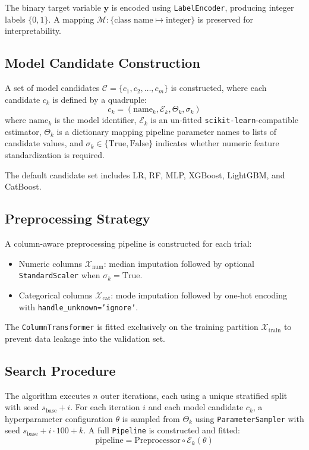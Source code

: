 \documentclass[diagnostics,article,submit,pdftex,moreauthors]{Definitions/mdpi}
\begin{document}
The binary target variable $\mathbf{y}$ is encoded using
\texttt{LabelEncoder}, producing integer labels $\{0, 1\}$. A mapping
$\mathcal{M}: \{\text{class name} \mapsto \text{integer}\}$ is
preserved for interpretability.

\subsection[\appendixname~\thesubsection]{Model Candidate
  Construction}
A set of model candidates $\mathcal{C} = \{c_1, c_2, \ldots, c_m\}$ is
constructed, where each candidate $c_k$ is defined by a quadruple:
\[
c_k = (\text{name}_k, \mathcal{E}_k, \Theta_k, \sigma_k)
\]
where $\text{name}_k$ is the model identifier, $\mathcal{E}_k$ is an
un-fitted \texttt{scikit-learn}-compatible estimator, $\Theta_k$ is a
dictionary mapping pipeline parameter names to lists of candidate
values, and $\sigma_k \in \{\text{True}, \text{False}\}$ indicates
whether numeric feature standardization is required.

The default candidate set includes \ac{LR}, \ac{RF}, \ac{MLP},
XGBoost, LightGBM, and CatBoost.

\subsection[\appendixname~\thesubsection]{Preprocessing Strategy}
A column-aware preprocessing pipeline is constructed for each trial:
\begin{itemize}
    \item Numeric columns $\mathcal{X}_{\text{num}}$: median imputation followed by optional \texttt{StandardScaler} when $\sigma_k = \text{True}$.
    \item Categorical columns $\mathcal{X}_{\text{cat}}$: mode imputation followed by one-hot encoding with \texttt{handle\_unknown='ignore'}.
\end{itemize}
The \texttt{ColumnTransformer} is fitted exclusively on the training
partition $\mathcal{X}_{\text{train}}$ to prevent data leakage into
the validation set.

\subsection[\appendixname~\thesubsection]{Search Procedure}
The algorithm executes $n$ outer iterations, each using a unique
stratified split with seed $s_{\text{base}} + i$. For each iteration
$i$ and each model candidate $c_k$, a hyperparameter configuration
$\theta$ is sampled from $\Theta_k$ using \texttt{ParameterSampler}
with seed $s_{\text{base}} + i \cdot 100 + k$. A full
\texttt{Pipeline} is constructed and fitted:
\[
\text{pipeline} = \text{Preprocessor} \circ \mathcal{E}_k(\theta)
\]
\end{document}
